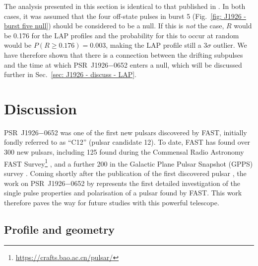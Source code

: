 The analysis presented in this section is identical to that published in \citet{ZLH+2019}. In both cases, it was assumed that the four off-state pulses in burst 5 (Fig.~\ref{fig: J1926 - burst five null}) should be considered to be a null. If this is \textit{not} the case, $R$ would be 0.176 for the LAP profiles and the probability for this to occur at random would be $P(R\geq 0.176) = 0.003$, making the LAP profile still a $3\sigma$ outlier. We have therefore shown that there is a connection between the drifting subpulses and the time at which PSR~J1926$-$0652 enters a null, which will be discussed further in Sec.~\ref{sec: J1926 - discuss - LAP}.



















\section{Discussion}
\label{sec: J1926 - discussion}

PSR~J1926$-$0652 was one of the first new pulsars discovered by FAST, initially fondly referred to as ``C12'' (pulsar candidate 12). To date, FAST has found over 300 new pulsars, including 125 found during the Commensal Radio Astronomy FAST Survey\footnote{\url{https://crafts.bao.ac.cn/pulsar/}} \citep[CRAFTS;][]{LWQ+2018}, and a further 200 in the Galactic Plane Pulsar Snapshot (GPPS) survey \citep{HWW+2021}. Coming shortly after the publication of the first discovered pulsar \citep{QPL+2019}, the work on PSR~J1926$-$0652 by \citet{ZLH+2019} represents the first detailed investigation of the single pulse properties and polarisation of a pulsar found by FAST. This work therefore paves the way for future studies with this powerful telescope.

\subsection{Profile and geometry}
\label{sec: J1926 - discuss - geometry}

